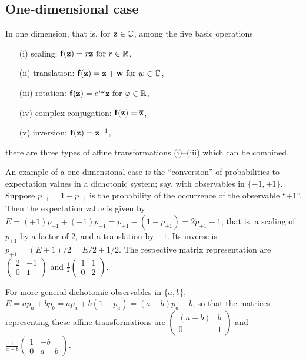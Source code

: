 \subsection{One-dimensional case}
In {one dimension}, that is,  for ${\bf z}\in {\Bbb C}$, among the five basic operations
\begin{itemize}
\item[(i)] scaling:  $\textsf{\textbf{f}}({\bf z}) = r  {\bf z}  \textrm{ for } r\in {\Bbb R}$,
\item[(ii)] translation:  $\textsf{\textbf{f}}({\bf z}) = {\bf z} + {\bf w}  \textrm{ for } w\in {\Bbb C}$,
\item[(iii)] rotation: $ \textsf{\textbf{f}}({\bf z}) = e^{i\varphi}{\bf z}    \textrm{ for } \varphi\in {\Bbb R}$,
\item[(iv)] complex conjugation: $\textsf{\textbf{f}}({\bf z}) = \overline{{\bf z}}$,
\item[(v)] inversion: $\textsf{\textbf{f}}({\bf z}) = {\bf z}^{-1}$,
\end{itemize}
there are three types of
affine transformations (i)--(iii)  which can be combined.



{
\color{blue}
\bexample

An example of a one-dimensional case is the ``conversion'' of probabilities to expectation values in a dichotonic system; say, with observables
in $\{-1,+1\}$.
Suppose $p_{+1} = 1-p_{-1}$ is the probability of the occurrence of the observable ``$+1$''.
Then the expectation value is given by $E =  (+1)p_{+1} + (-1)p_{-1} =  p_{+1} - (1-p_{+1}) = 2 p_{+1}-1$; that is, a scaling of $p_{+1}$ by a factor of $2$, and a translation
by $-1$.
Its inverse is $p_{+1} = (E+1)/2= E/2 + 1/2$.
The respective matrix representation are
$\begin{pmatrix}
2&-1\\
0&1
\end{pmatrix}$
and
$\frac{1}{2}\begin{pmatrix}
1&1\\
0&2
\end{pmatrix}$.

For more general dichotomic observables
in $\{a,b\}$,
 $E =  a p_{a} + bp_{b} =  a p_{a} + b(1-p_{a}) = (a-b) p_{a}+b$, so that the matrices representing these affine transformations are
$\begin{pmatrix}
(a-b)&b\\
0&1
\end{pmatrix}$
and
$\frac{1}{a-b}\begin{pmatrix}
1&-b\\
0&a-b
\end{pmatrix}$.

\eexample
}



